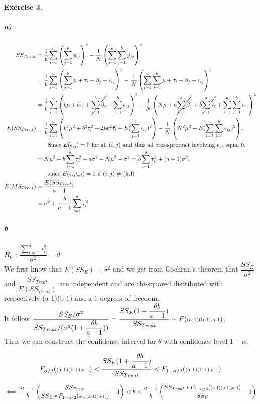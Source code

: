 \documentclass{article}
\begin{document}
\paragraph{Exercise 3.}
\subparagraph{a)}
\begin{align*}
 SS_{Treat} &= \dfrac{1}{b} \sum_{i=1}^a \left( \sum_{j=1}^b y_{ij} \right) ^2- \dfrac{1}{N}\left( \sum_{i=1}^a \sum_{j=1}^b y_{ij} \right)^2 \\ 
 &= \dfrac{1}{b} \sum_{i=1}^a \left( \sum_{j=1}^b \mu + \tau_i + \beta_j + \epsilon_{ij} \right) ^2-\dfrac{1}{N}\left( \sum_{i=1}^a \sum_{j=1}^b \mu + \tau_i +\beta_j + \epsilon_{ij} \right)^2 \\
 &= \dfrac{1}{b} \sum_{i=1}^a \left( b\mu + b\tau_i + \cancel{\sum_{j=1}^b\beta_j} + \sum_{j=1}^b \epsilon_{ij} \right) ^2- \dfrac{1}{N}\left(N\mu + a\cancel{\sum_{j=1}^b\beta_j} +b\cancel{\sum_{i=1}^a\tau_i} + \sum_{i=1}^a \sum_{j=1}^b\epsilon_{ij} \right)^2\\
 E(SS_{Treat}) &= \dfrac{1}{b} \sum_{i=1}^a \left( b^2\mu^2 + b^2\tau_i^2 + \cancel{2 \mu b^2\tau_i} + E(\sum_{j=1}^b \epsilon_{ij})^2 \right)- \dfrac{1}{N}\left(N^2\mu^2 + E(\sum_{i=1}^a \sum_{j=1}^b\epsilon_{ij})^2 \right), \\
 & \qquad \text{Since $E(\epsilon_{ij})=0$ for all $(i,j)$ and thus all cross-product involving $\epsilon_{ij}$ equal 0}. \\
&= N\mu^2+ b\sum_{i=1}^a\tau_i^2 + a \sigma^2 - N\mu^2- \sigma^2=b\sum_{i=1}^a\tau_i^2 +(a-1)\sigma^2, \\
& \qquad \text{since $E(\epsilon_{ij}\epsilon_{kl})=0$ if $(i,j)$ $\neq$  (k,l)} \\
E(MS_{Treat}) &= \dfrac{E(SS_{Treat})}{a-1} \\
 &= \sigma^2+ \dfrac{b}{a-1}\sum_{i=1}^a\tau_i^2
\end{align*}
\subparagraph{b}


$H_0$ : $\dfrac{\sum_{i=1}^a\tau_i^2}{\sigma^2}=\theta$\\


We first know that $E(SS_E)=\sigma^2$ and we get from Cochran's theorem that $\dfrac{SS_E}{\sigma^2}$ and 
$\dfrac{SS_{Treat}}{E(SS_{Treat})}$ 
are independent and are chi-squared distributed with respectively (a-1)(b-1) and a-1 degrees of freedom. \\


It follow $\dfrac{SS_E/\sigma^2}{SS_{Treat}/(\sigma^2(1+ \dfrac{\theta b}{a-1}))}=\dfrac{SS_E(1+ \dfrac{\theta b}{a-1})}{SS_{Treat}} \sim F(\mbox{\scriptsize(a-1)(b-1),a-1})$, \\
Thus we can construct the confidence interval for $\theta$ with confidence level $1-\alpha$.
\begin{center}

$$F_{\alpha/2}(\mbox{\scriptsize(a-1)(b-1),a-1}) < \dfrac{SS_E(1+ \dfrac{\theta b}{a-1})}{SS_{Treat}} <F_{1-\alpha/2}(\mbox{\scriptsize(a-1)(b-1),a-1}) $$


$$\iff \dfrac{a-1}{b}\left( \dfrac{SS_{Treat}}{SS_{E}*F_{1-\alpha/2}(\mbox{\scriptsize a-1,(a-1)(b-1)})}-1\right)  
<\theta <
\dfrac{a-1}{b}\left( \dfrac{SS_{Treat}*F_{1-\alpha/2}(\mbox{\scriptsize(a-1)(b-1),a-1})}{SS_{E}}-1\right) $$
\end{center}
\end{document}
